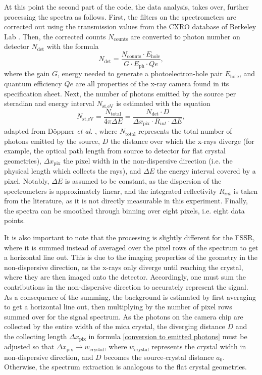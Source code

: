 At this 
point the second part of the code, the data analysis, takes over, further processing the spectra as follows. First, the filters on the spectrometers are corrected out using the transmission 
values from the CXRO database of Berkeley Lab \citep{cxro_database}. Then, the corrected counts $N_{\text{counts}}$ are converted to photon number on detector $N_{\text{det}}$ with the formula
\begin{equation}
N_{\text{det}} = \frac{N_{\text{counts}}\cdot E_{\text{hole}}}{G\cdot E_{\text{ph}}\cdot Qe},
\label{eq: detector correction}
\end{equation}
where the 
gain $G$, energy needed to generate a photoelectron-hole pair $E_{\text{hole}}$, and quantum 
efficiency $Qe$ are all properties of the x-ray camera found in its 
specification sheet. Next, the number of photons emitted by the source per steradian and energy interval $N_{\text{st,eV}}$ is estimated with the equation
\begin{equation}
	N_{\text{st,eV}} = \frac{N_{\text{total}}}{4\pi \Delta E} = \frac{N_{\text{det}}\cdot D}{\Delta x_{\text{pix}}\cdot R_{int}\cdot \Delta E},
	\label{conversion to emitted photons}
\end{equation}
adapted from Döppner \textit{et al.} \citep{doppner2008high}, where $N_{\text{total}}$ represents the total number of photons emitted by 
the source, $D$ 
the distance 
over which the x-rays diverge (for example, the optical path length 
from source 
to detector for flat crystal geometries), $\Delta x_{\text{pix}}$ the 
pixel width in the non-dispersive direction (i.e. the physical length which collects the rays), and $\Delta E$ the energy interval covered by a pixel. Notably, $\Delta E$ is assumed to be constant, as the dispersion of the spectrometers is approximately linear, and the integrated reflectivity $R_{int}$ is taken from the literature, as it is not directly measurable in this experiment. Finally, the spectra can be smoothed through binning over eight pixels, i.e. eight data points.

It is also important to note that the processing is slightly different for the FSSR, where it is summed instead of averaged over the pixel rows of the spectrum to get a horizontal line out. This is due to the imaging properties of the geometry in the non-dispersive direction, as the x-rays only diverge until reaching the crystal, where they are then imaged onto the detector. Accordingly, one must sum the contributions in the non-dispersive direction to accurately represent the signal. As a consequence of the summing, the background is estimated by first averaging to get a horizontal line out, then multiplying by the number of pixel rows summed over for the signal spectrum. As the photons on the camera chip are collected by the entire width of the mica crystal, the diverging distance $D$ and the collecting length $\Delta x_{\text{pix}}$ in formula \ref{conversion to emitted photons} must be adjusted so that $\Delta x_{\text{pix}} \longrightarrow w_{\text{crystal}}$, where $w_{\text{crystal}}$ represents the crystal width in non-dispersive direction, and $D$ becomes the source-crystal distance $a_0$. Otherwise, the spectrum extraction is analogous to the flat crystal geometries.

